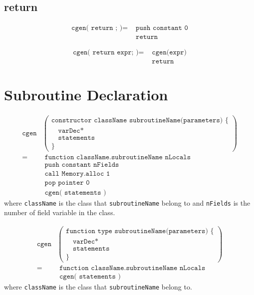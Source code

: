 \documentclass[a4paper]{book}
\begin{document}
\subsection*{return}
\begin{align*}
    \texttt{cgen( return ; )}  = & \texttt{ push constant 0} \\
                            & \texttt{ return}
\end{align*}

\begin{align*}
    \texttt{cgen( return expr; )} = & \texttt{ cgen(expr)} \\
                             & \texttt{ return}
\end{align*}

\section*{Subroutine Declaration}


\begin{align*}
    \texttt{cgen} &
    \left(
        \begin{array}{l}
            \texttt{constructor className subroutineName(parameters) \{ } \\
            \texttt{~ ~varDec*} \\
            \texttt{~ ~statements} \\
            \texttt{\} }
        \end{array}
    \right) \\
    = & \texttt{ function className.subroutineName nLocals} \\
      & \texttt{ push constant nFields} \\
      & \texttt{ call Memory.alloc 1 } \\
      & \texttt{ pop pointer 0 } \\
      & \texttt{ cgen( statements )}
\end{align*}
where \texttt{className} is the class that \texttt{subroutineName} belong to and \texttt{nFields} is the number of field variable in the class.

\begin{align*}
    \texttt{cgen} &
    \left(
        \begin{array}{l}
            \texttt{function type subroutineName(parameters) \{ } \\
            \texttt{~ ~varDec*} \\
            \texttt{~ ~statements} \\
            \texttt{\} }
        \end{array}
    \right) \\
    = & \texttt{ function className.subroutineName nLocals} \\
      & \texttt{ cgen( statements )}
\end{align*}
where \texttt{className} is the class that \texttt{subroutineName} belong to.
\end{document}
